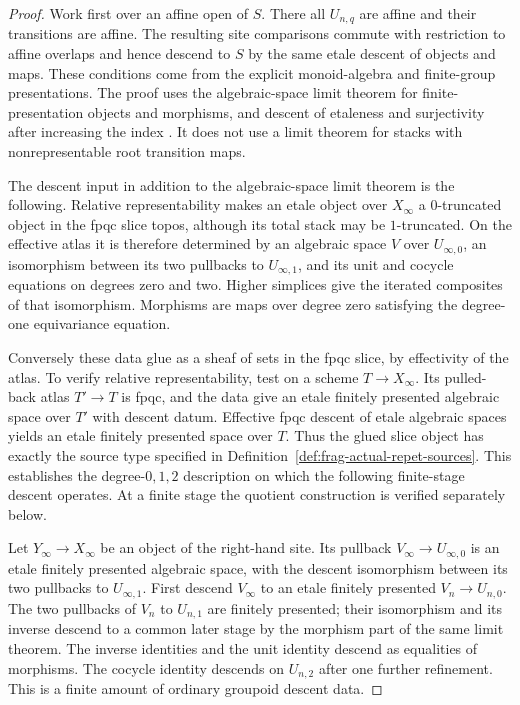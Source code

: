 \documentclass[11pt]{article}
\theoremstyle{definition}
\theoremstyle{remark}
\begin{document}
\begin{proof}
Work first over an affine open of $S$.  There all $U_{n,q}$ are
affine and their transitions are affine.  The resulting site
comparisons commute with restriction to affine overlaps and hence
descend to $S$ by the same etale descent of objects and maps.  These
conditions come from the explicit monoid-algebra and finite-group
presentations.  The proof uses the algebraic-space limit theorem for
finite-presentation objects and morphisms, and descent of etaleness
and surjectivity after increasing the index
\cite{StacksSpaceLimitDescent}.  It does not use a limit theorem for
stacks with nonrepresentable root transition maps.

The descent input in addition to the algebraic-space limit theorem
is the following.  Relative representability makes an etale object
over $X_\infty$ a $0$-truncated object in the fpqc slice topos,
although its total stack may be $1$-truncated.  On the effective
atlas it is therefore determined by an algebraic space $V$ over
$U_{\infty,0}$, an isomorphism between its two pullbacks to
$U_{\infty,1}$, and its unit and cocycle equations on degrees zero
and two.  Higher simplices give the iterated composites of that
isomorphism.
Morphisms are maps over degree zero satisfying the degree-one
equivariance equation.

Conversely these data glue as a sheaf of sets in the fpqc slice,
by effectivity of the atlas.  To verify relative representability,
test on a scheme $T\to X_\infty$.  Its pulled-back atlas $T'\to T$
is fpqc, and the data give an etale finitely presented algebraic
space over $T'$ with descent datum.  Effective fpqc descent of
etale algebraic spaces yields an etale finitely presented space
over $T$.  Thus the glued slice object has exactly the source type
specified in Definition~\ref{def:frag-actual-repet-sources}.
This establishes the degree-$0,1,2$ description on which the
following finite-stage descent operates.  At a finite stage the
quotient construction is verified separately below.

Let $Y_\infty\to X_\infty$ be an object of the right-hand site.
Its pullback $V_\infty\to U_{\infty,0}$ is an etale finitely presented
algebraic space, with the descent isomorphism between its two
pullbacks to $U_{\infty,1}$.  First descend $V_\infty$ to an etale
finitely presented $V_n\to U_{n,0}$.  The two pullbacks of $V_n$
to $U_{n,1}$ are finitely presented; their isomorphism and its inverse
descend to a common later stage by the morphism part of the same
limit theorem.  The inverse identities and the unit identity descend
as equalities of morphisms.  The cocycle identity descends on
$U_{n,2}$ after one further refinement.  This is a finite amount of
ordinary groupoid descent data.


\end{proof}
\end{document}

